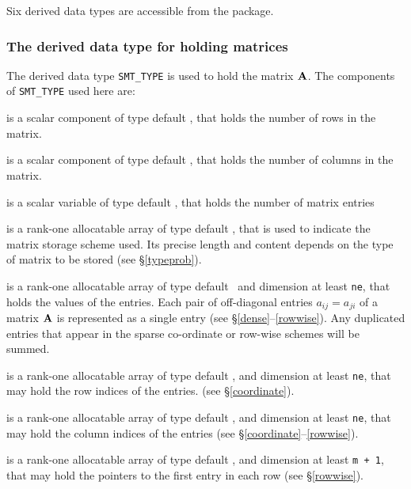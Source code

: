 \documentclass{galahad}
\begin{document}




\galtypes
Six derived data types are accessible from the package.


\subsubsection{The derived data type for holding matrices}\label{typesmt}
The derived data type {\tt SMT\_TYPE} is used to hold the matrix ${\mathbf{A}}$.
The components of {\tt SMT\_TYPE} used here are:

\begin{description}

 is a scalar component of type default \integer, 
that holds the number of rows in the matrix. 
 
 is a scalar component of type default \integer, 
that holds the number of columns in the matrix. 
 
 is a scalar variable of type default \integer, that
holds the number of matrix entries

 is a rank-one allocatable array of type default \character, that
is used to indicate the matrix storage scheme used. Its precise length and
content depends on the type of matrix to be stored (see \S\ref{typeprob}).

 is a rank-one allocatable array of type default \realdp\, 
and dimension at least {\tt ne}, that holds the values of the entries. 
Each pair of off-diagonal entries $a_{ij} = a_{ji}$ of a matrix ${\mathbf{A}}$ 
is represented as a single entry 
(see \S\ref{dense}--\ref{rowwise}).
Any duplicated entries that appear in the sparse 
co-ordinate or row-wise schemes will be summed. 

 is a rank-one allocatable array of type default \integer, 
and dimension at least {\tt ne}, that may hold the row indices of the entries. 
(see \S\ref{coordinate}).

 is a rank-one allocatable array of type default \integer, 
and dimension at least {\tt ne}, that may hold the column indices of the entries
(see \S\ref{coordinate}--\ref{rowwise}).

 is a rank-one allocatable array of type default \integer, 
and dimension at least {\tt m + 1}, that may hold the pointers to
the first entry in each row (see \S\ref{rowwise}).

\end{description}
\end{document}
